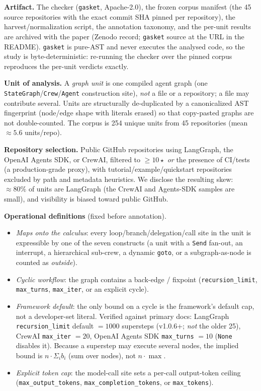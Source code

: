 \documentclass[11pt]{article}
\theoremstyle{plain}
\begin{document}
\textbf{Artifact.} The checker (\texttt{gasket}, Apache-2.0), the frozen corpus manifest (the 45
source repositories with the exact commit SHA pinned per repository), the harvest/normalization
script, the annotation taxonomy, and the per-unit results are archived with the paper (Zenodo
record; \texttt{gasket} source at the URL in the README). \texttt{gasket} is pure-AST and never
executes the analysed code, so the study is byte-deterministic: re-running the checker over the
pinned corpus reproduces the per-unit verdicts exactly.

\textbf{Unit of analysis.} A \emph{graph unit} is one compiled agent graph (one
\texttt{StateGraph}/\texttt{Crew}/\texttt{Agent} construction site), \emph{not} a file or a
repository; a file may contribute several. Units are structurally de-duplicated by a canonicalized
AST fingerprint (node/edge shape with literals erased) so that copy-pasted graphs are not
double-counted. The corpus is 254 unique units from 45 repositories (mean $\approx 5.6$ units/repo).

\textbf{Repository selection.} Public GitHub repositories using LangGraph, the OpenAI Agents SDK, or
CrewAI, filtered to $\ge 10\star$ \emph{or} the presence of CI/tests (a production-grade proxy), with
tutorial/example/quickstart repositories excluded by path and metadata heuristics. We disclose the
resulting skew: $\approx 80\%$ of units are LangGraph (the CrewAI and Agents-SDK samples are small),
and visibility is biased toward public GitHub.

\textbf{Operational definitions} (fixed before annotation).
\begin{itemize}
\item \emph{Maps onto the calculus}: every loop/branch/delegation/call site in the unit is
  expressible by one of the seven constructs (a unit with a \texttt{Send} fan-out, an interrupt, a
  hierarchical sub-crew, a dynamic \texttt{goto}, or a subgraph-as-node is counted as \emph{outside}).
\item \emph{Cyclic workflow}: the graph contains a back-edge / fixpoint (\texttt{recursion\_limit},
  \texttt{max\_turns}, \texttt{max\_iter}, or an explicit cycle).
\item \emph{Framework default}: the only bound on a cycle is the framework's default cap, not a
  developer-set literal. Verified against primary docs: LangGraph \texttt{recursion\_limit} default
  $= 1000$ supersteps (v1.0.6+; \emph{not} the older 25), CrewAI \texttt{max\_iter} $= 20$, OpenAI
  Agents SDK \texttt{max\_turns} $= 10$ (\texttt{None} disables it). Because a superstep may execute
  several nodes, the implied bound is $n \cdot \Sigma_i b_i$ (sum over nodes), not $n \cdot \max$.
\item \emph{Explicit token cap}: the model-call site sets a per-call output-token ceiling
  (\texttt{max\_output\_tokens}, \texttt{max\_completion\_tokens}, or \texttt{max\_tokens}).
\end{itemize}
\end{document}
